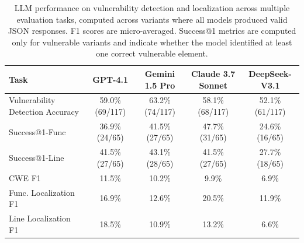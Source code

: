 \begin{table}[tbp]
\centering
\footnotesize
\caption{LLM performance on vulnerability detection and localization across multiple evaluation tasks, computed across variants where all models produced valid JSON responses. F1 scores are micro-averaged. Success@1 metrics are computed only for vulnerable variants and indicate whether the model identified at least one correct vulnerable element.}
\label{tab:vanilla_performance}
\begin{tabular}{lcccc}
\toprule
\textbf{Task} & \textbf{GPT-4.1} & \textbf{Gemini 1.5 Pro} & \textbf{Claude 3.7 Sonnet} & \textbf{DeepSeek-V3.1} \\
\midrule
Vulnerability Detection Accuracy & 59.0\% (69/117) & 63.2\% (74/117) & 58.1\% (68/117) & 52.1\% (61/117) \\
Success@1-Func & 36.9\% (24/65) & 41.5\% (27/65) & 47.7\% (31/65) & 24.6\% (16/65) \\
Success@1-Line & 41.5\% (27/65) & 43.1\% (28/65) & 41.5\% (27/65) & 27.7\% (18/65) \\
CWE F1 & 11.5\% & 10.2\% & 9.9\% & 6.9\% \\
Func. Localization F1 & 16.9\% & 12.6\% & 20.5\% & 11.9\% \\
Line Localization F1 & 18.5\% & 10.9\% & 13.2\% & 6.6\% \\
\bottomrule
\end{tabular}
\end{table}